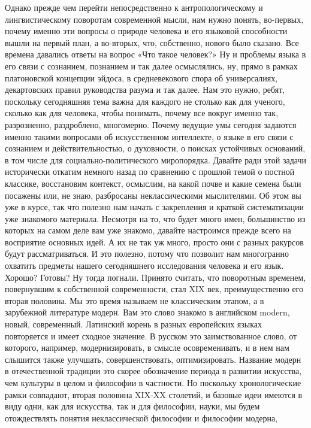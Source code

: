 Однако прежде чем перейти непосредственно к
антропологическому и лингвистическому поворотам современной мысли, нам нужно
понять, во-первых, почему именно эти вопросы о природе человека и его языковой
способности вышли на первый план, а во-вторых, что, собственно, нового было
сказано. Все времена давались ответы на вопрос «Что такое человек?» Ну и
проблемы языка в его связи с сознанием, познанием и так далее осмыслялись, ну,
прямо в рамках платоновской концепции эйдоса, в средневекового спора об
универсалиях, декартовских правил руководства разума и так далее. Нам это нужно,
ребят, поскольку сегодняшняя тема важна для каждого не столько как для ученого,
сколько как для человека, чтобы понимать, почему все вокруг именно так,
разрозненно, раздроблено, многомерно. Почему ведущие умы сегодня задаются именно
такими вопросами об искусственном интеллекте, о языке в его связи с сознанием и
действительностью, о духовности, о поисках устойчивых оснований, в том числе для
социально-политического миропорядка. Давайте ради этой задачи исторически
откатим немного назад по сравнению с прошлой темой о постной классике,
восстановим контекст, осмыслим, на какой почве и какие семена были посажены или,
не знаю, разбросаны неклассическими мыслителями. Об этом вы уже в курсе, так что
полезно нам начать с закрепления и краткой систематизации уже знакомого
материала. Несмотря на то, что будет много имен, большинство из которых на самом
деле вам уже знакомо, давайте настроимся прежде всего на восприятие основных
идей. А их не так уж много, просто они с разных ракурсов будут рассматриваться.
И это полезно, потому что позволит нам многогранно охватить предметы нашего
сегодняшнего исследования человека и его язык. Хорошо? Готовы? Ну тогда погнали.
Принято считать, что поворотным временем, повернувшим к собственной
современности, стал XIX век, преимущественно его вторая половина. Мы это время
называем не классическим этапом, а в зарубежной литературе модерн. Вам это слово
знакомо в английском modern, новый, современный. Латинский корень в разных
европейских языках повторяется и имеет сходное значение. В русском это
заимствованное слово, от которого, например, модернизировать, в смысле
осовременивать, и в нем нам слышится также улучшать, совершенствовать,
оптимизировать. Название модерн в отечественной традиции это скорее обозначение
периода в развитии искусства, чем культуры в целом и философии в частности. Но
поскольку хронологические рамки совпадают, вторая половина XIX-XX столетий, и
базовые идеи имеются в виду одни, как для искусства, так и для философии, науки,
мы будем отождествлять понятия неклассической философии и философии модерна,
